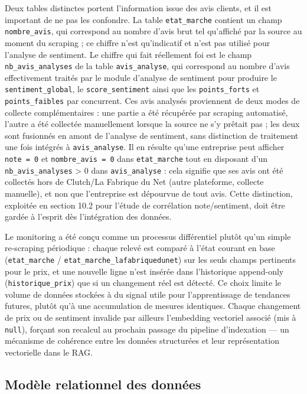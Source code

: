 Deux tables distinctes portent l'information issue des avis clients, et il est important de ne pas les
confondre. La table \texttt{etat\_marche} contient un champ \texttt{nombre\_avis}, qui correspond au nombre
d'avis brut tel qu'affiché par la source au moment du scraping ; ce chiffre n'est qu'indicatif et n'est pas
utilisé pour l'analyse de sentiment. Le chiffre qui fait réellement foi est le champ
\texttt{nb\_avis\_analyses} de la table \texttt{avis\_analyse}, qui correspond au nombre d'avis effectivement
traités par le module d'analyse de sentiment pour produire le \texttt{sentiment\_global}, le
\texttt{score\_sentiment} ainsi que les \texttt{points\_forts} et \texttt{points\_faibles} par concurrent. Ces
avis analysés proviennent de deux modes de collecte complémentaires : une partie a été récupérée par
scraping automatisé, l'autre a été collectée manuellement lorsque la source ne s'y prêtait pas ; les deux
sont fusionnés en amont de l'analyse de sentiment, sans distinction de traitement une fois intégrés à
\texttt{avis\_analyse}. Il en résulte qu'une entreprise peut afficher \texttt{note = 0} et
\texttt{nombre\_avis = 0} dans \texttt{etat\_marche} tout en disposant d'un \texttt{nb\_avis\_analyses} > 0
dans \texttt{avis\_analyse} : cela signifie que ses avis ont été collectés hors de Clutch/La Fabrique du
Net (autre plateforme, collecte manuelle), et non que l'entreprise est dépourvue de tout avis. Cette
distinction, exploitée en section 10.2 pour l'étude de corrélation note/sentiment, doit être gardée à
l'esprit dès l'intégration des données.

Le monitoring a été conçu comme un processus différentiel plutôt qu'un simple re-scraping périodique :
chaque relevé est comparé à l'état courant en base (\texttt{etat\_marche} /
\texttt{etat\_marche\_la\-fabri\-quedunet})
sur les seuls champs pertinents pour le prix, et une nouvelle ligne n'est insérée dans l'historique
append-only (\texttt{historique\_prix}) que si un changement réel est détecté. Ce choix limite le volume de
données stockées à du signal utile pour l'apprentissage de tendances futures, plutôt qu'à une accumulation de
mesures identiques. Chaque changement de prix ou de sentiment invalide par ailleurs l'embedding vectoriel
associé (mis à \texttt{null}), forçant son recalcul au prochain passage du pipeline d'indexation --- un
mécanisme de cohérence entre les données structurées et leur représentation vectorielle dans le RAG.

\subsection{Modèle relationnel des données}


